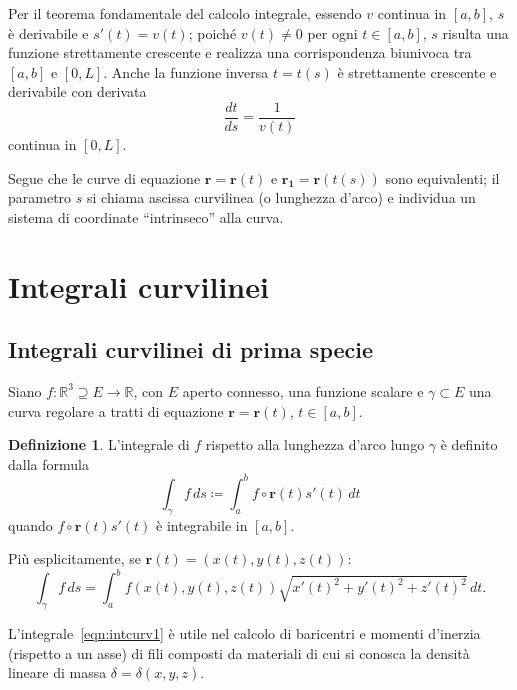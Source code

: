 \documentclass[a4paper]{book}
\numberwithin{equation}{section}
\theoremstyle{plain}
\theoremstyle{definition}
\newtheorem{defn}{Definizione}[section]
\theoremstyle{remark}
\renewcommand{\vec}{\boldsymbol}
\theoremstyle{example}
\begin{document}
Per il teorema fondamentale del calcolo integrale, essendo $v$ continua in $[a, b]$, $s$ è derivabile e $s'(t) = v(t)$; poiché $v(t) \ne 0$ per ogni $t \in [a, b]$, $s$ risulta una funzione strettamente crescente e realizza una corrispondenza biunivoca tra $[a, b]$ e $[0, L]$. Anche la funzione inversa $t = t(s)$ è strettamente crescente e derivabile con derivata
	\begin{equation*}
	\frac{dt}{ds} = \frac{1}{v(t)}
	\end{equation*}
continua in $[0, L]$.

Segue che le curve di equazione $\vec{r} = \vec{r}(t)$ e $\vec{r_1} = \vec{r}(t(s))$ sono equivalenti; il parametro $s$ si chiama ascissa curvilinea (o lunghezza d'arco) e individua un sistema di coordinate ``intrinseco'' alla curva.

\section{Integrali curvilinei}
\subsection{Integrali curvilinei di prima specie}

Siano $f \colon \mathbb{R}^3 \supseteq E \to \mathbb{R}$, con $E$ aperto connesso, una funzione scalare e $\gamma \subset E$ una curva regolare a tratti di equazione $\vec{r} = \vec{r}(t)$, $t \in [a, b]$.

	\begin{defn}
	L'integrale di $f$ rispetto alla lunghezza d'arco lungo $\gamma$ è definito dalla formula
		\begin{equation}
		\label{eqn:intcurv1}
		\int_{\gamma}f\, ds \coloneqq \int_a^b f \circ \vec{r}(t)s'(t)\, dt
		\end{equation}
	quando $f \circ \vec{r}(t)s'(t)$ è integrabile in $[a, b]$.
	\end{defn}

Più esplicitamente, se $\vec{r}(t) = (x(t), y(t), z(t))$:
	\begin{equation*}
	\int_{\gamma} f \, ds = \int_a^b f(x(t), y(t), z(t)) \sqrt{x'(t)^2 + y'(t)^2 + z'(t)^2} \, dt.
	\end{equation*}

L'integrale~\eqref{eqn:intcurv1} è utile nel calcolo di baricentri e momenti d'inerzia (rispetto a un asse) di fili composti da materiali di cui si conosca la densità lineare di massa $\delta = \delta(x, y, z)$.
\end{document}
